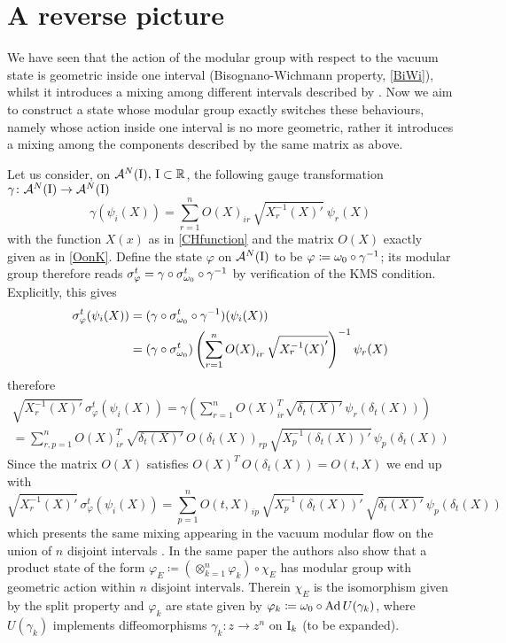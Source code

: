 \section{A reverse picture}
\label{}

\noindent We have seen that the action of the modular group
with respect to the vacuum state is geometric inside one
interval (Bisognano-Wichmann property, \ref{BiWi}), 
whilst it introduces a mixing among different intervals
described by \cite*{CH:2009}. 
Now we aim to construct a state whose modular group
exactly switches these behaviours, namely whose action
inside one interval is no more geometric, rather it
introduces a mixing among the components described by 
the same matrix as above.

\bigskip
Let us consider, on $\mathcal{A}^N(\textrm{I}),\,\textrm{I}\subset\mathbb{R}$, 
the following gauge transformation $\gamma\colon 
\mathcal{A}^N(\textrm{I})\to\mathcal{A}^N(\textrm{I})$
\[
\gamma(\psi_i(X))=\sum_{r=1}^n {O(X)}_{ir}\,\sqrt{{X_r^{-1}(X)}'}\ 
\psi_r(X)
\]
with the function $X(x)$ as in \eqref{CHfunction} and the 
matrix $O(X)$ exactly given as in \eqref{OonK}. Define the
state $\varphi$ on $\mathcal{A}^N(\textrm{I})$ to be $\varphi
\coloneqq \omega_0\circ{\gamma}^{-1}$; its modular group therefore reads
$\sigma^t_{\varphi}= \gamma\circ\sigma^t_{\omega_0}\circ{\gamma}^{-1}$
by verification of the \ac{KMS} condition. Explicitly, this gives
\begin{align*}
\sigma^t_{\varphi}(\psi_i(X))&=
(\gamma\circ\sigma^t_{\omega_0}\circ{\gamma}^{-1})(\psi_i(X))\\
&=(\gamma\circ\sigma^t_{\omega_0})
\left(\sum_{r=1}^n{O(X)}_{ir}\,{\sqrt{{X_r^{-1}(X)}'}}\right)^{-1}\psi_r(X)\\
\end{align*}
therefore
\begin{multline*}
\sqrt{{X_r^{-1}(X)}'}\,\sigma^t_{\varphi}(\psi_i(X))=
\gamma\left(\sum_{r=1}^n{O(X)}^T_{ir}\sqrt{\delta_t(X)'}\,
\psi_r(\delta_t(X))\right)\\
=\sum_{r,p=1}^n {O(X)}^T_{ir}\,\sqrt{\delta_t(X)'}\,
{O(\delta_t(X))}_{rp}\, \sqrt{{X_p^{-1}(\delta_t(X))}'}\,
\psi_p(\delta_t(X))
\end{multline*}
Since the matrix $O(X)$ satisfies $O(X)^T\,O(\delta_t(X))=
O(t,X)$ we end up with
\[
\sqrt{{X_r^{-1}(X)}'}\,\sigma^t_{\varphi}(\psi_i(X))=
\sum_{p=1}^n O(t,X)_{ip}\,\sqrt{{X_p^{-1}(\delta_t(X))}'}\,
\sqrt{\delta_t(X)'}\,\psi_p(\delta_t(X))
\]
which presents the same mixing appearing in the vacuum modular
flow on the union of $n$ disjoint intervals \cite*[eq (3.1)]{LMR:2009}.
In the same paper the authors also show that a product state
of the form $\varphi_E\coloneqq (\otimes_{k=1}^n \varphi_k)\circ
\chi_E$ has modular group with geometric action within $n$ disjoint
intervals. Therein $\chi_E$ is the isomorphism given by the split
property and $\varphi_k$ are state given by $\varphi_k\coloneqq \omega_0\circ
\operatorname{Ad} U(\gamma_k)$, where $U(\gamma_k)$ implements diffeomorphisms
$\gamma_k\colon z\to z^n$ on $\textrm{I}_k$ (to be expanded).
